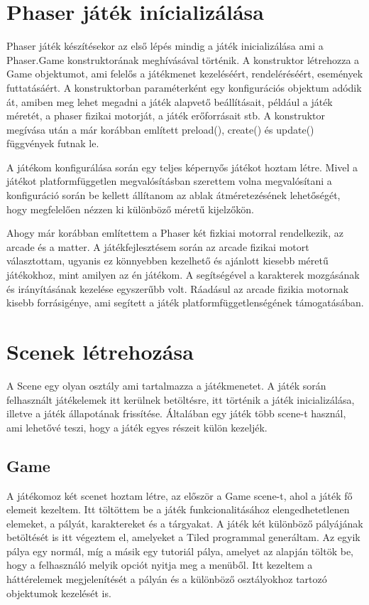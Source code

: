 \documentclass[12pt, a4paper]{report}
\theoremstyle{definition}
\begin{document}
	\section{Phaser játék inícializálása}
	Phaser játék készítésekor az első lépés mindig a játék inicializálása ami a Phaser.Game konstruktorának meghívásával történik. A konstruktor létrehozza a  Game objektumot, ami felelős a játékmenet kezeléséért, rendeléréséért, események futtatásáért. A konstruktorban paraméterként egy konfigurációs objektum adódik át, amiben meg lehet megadni a játék alapvető beállításait, például a játék méretét, a phaser fizikai motorját, a játék erőforrásait stb. A konstruktor megívása után a már korábban említett preload(), create() és update() függvények futnak le.
	
	A játékom konfigurálása során egy teljes képernyős játékot hoztam létre. Mivel a játékot platformfüggetlen megvalósításban szerettem volna megvalósítani a konfiguráció során be kellett állítanom az ablak átméretezésének lehetőségét, hogy megfelelően nézzen ki különböző méretű kijelzőkön.
	
	Ahogy már korábban említettem a Phaser két fizkiai motorral rendelkezik, az arcade és a matter. A játékfejlesztésem során az arcade fizikai motort választottam, ugyanis ez könnyebben kezelhető és ajánlott kiesebb méretű játékokhoz, mint amilyen az én játékom. A segítségével a karakterek mozgásának és irányításának kezelése egyszerűbb volt. Ráadásul az arcade fizikia motornak kisebb forrásigénye, ami segített a játék platformfüggetlenségének támogatásában.
	
	\section{Scenek létrehozása}
	A Scene egy olyan osztály ami tartalmazza a játékmenetet. A játék során felhasznált játékelemek itt kerülnek betöltésre, itt történik a játék inicializálása, illetve a játék állapotának frissítése. Általában egy játék több scene-t használ, ami lehetővé teszi, hogy a játék egyes részeit külön kezeljék. 
	 
	\subsection{Game}
	A játékomoz két scenet hoztam létre, az először a Game scene-t, ahol a játék fő elemeit kezeltem. Itt töltöttem be a játék funkcionalitásához elengedhetetlenen elemeket, a pályát, karaktereket és a tárgyakat. A játék két különböző pályájának betöltését is itt végeztem el, amelyeket a Tiled programmal generáltam. Az egyik pálya egy normál, míg a másik egy tutoriál pálya, amelyet az alapján töltök be, hogy a felhasználó melyik opciót nyitja meg a menüből. Itt kezeltem a háttérelemek megjelenítését a pályán és a különböző osztályokhoz tartozó objektumok kezelését is. 
	
\end{document}
